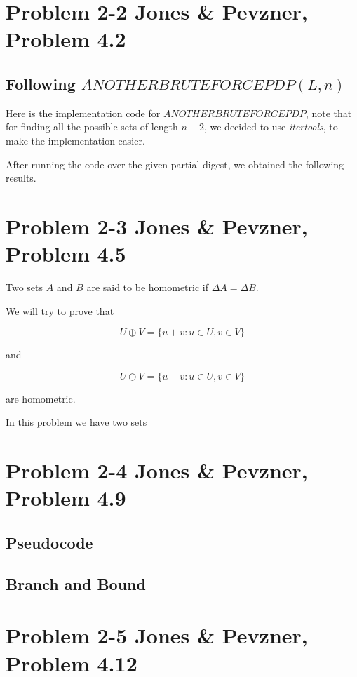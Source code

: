 \documentclass{article}
\begin{document}
\section*{Problem 2-2 Jones \& Pevzner, Problem 4.2}

\subsection*{Following $ANOTHERBRUTEFORCEPDP(L,n)$}

Here is the implementation code for $ANOTHERBRUTEFORCEPDP$, note that for finding all the possible sets of length $n-2$, we decided to use \textit{itertools}, to make the implementation easier.



After running the code over the given partial digest, we obtained the following results.



\section*{Problem 2-3 Jones \& Pevzner, Problem 4.5}

Two sets $A$ and $B$ are said to be homometric if $\Delta A = \Delta B$.

We will try to prove that

$$U\oplus V = \{ u+v:u\in U,v\in V \}$$

and

$$U\ominus V = \{ u-v:u\in U,v\in V \}$$

are homometric.

In this problem we have two sets

\section*{Problem 2-4 Jones \& Pevzner, Problem 4.9}

\subsection*{Pseudocode}

\subsection*{Branch and Bound}

\section*{Problem 2-5 Jones \& Pevzner, Problem 4.12}
\end{document}
